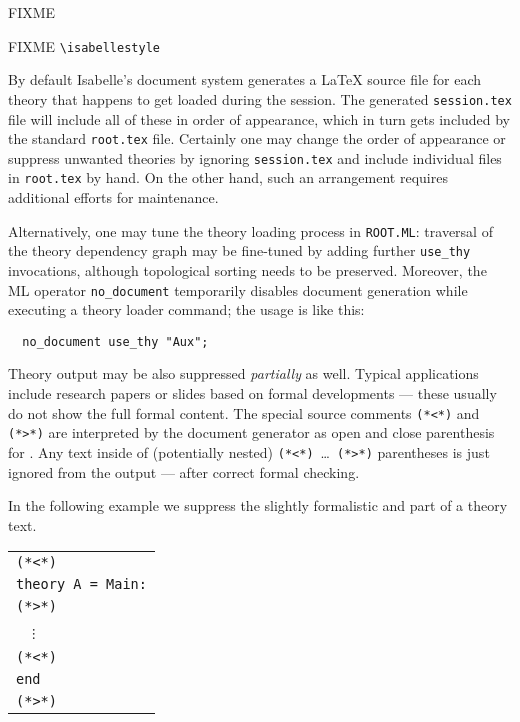 \begin{isabellebody}
\begin{isamarkuptext}
  FIXME%
\end{isamarkuptext}%
\isamarkuptrue%
%
\isamarkuptrue%
%
\begin{isamarkuptext}%
FIXME \verb,\isabellestyle,%
\end{isamarkuptext}%
\isamarkuptrue%
%
\isamarkuptrue%
%
\begin{isamarkuptext}%
By default Isabelle's document system generates a {\LaTeX} source
  file for each theory that happens to get loaded during the session.
  The generated \texttt{session.tex} file will include all of these in
  order of appearance, which in turn gets included by the standard
  \texttt{root.tex} file.  Certainly one may change the order of
  appearance or suppress unwanted theories by ignoring
  \texttt{session.tex} and include individual files in
  \texttt{root.tex} by hand.  On the other hand, such an arrangement
  requires additional efforts for maintenance.

  Alternatively, one may tune the theory loading process in
  \texttt{ROOT.ML}: traversal of the theory dependency graph may be
  fine-tuned by adding further \verb,use_thy, invocations, although
  topological sorting needs to be preserved.  Moreover, the ML
  operator \verb,no_document, temporarily disables document generation
  while executing a theory loader command; the usage is like this:

\begin{verbatim}
  no_document use_thy "Aux";
\end{verbatim}

  Theory output may be also suppressed \emph{partially} as well.
  Typical applications include research papers or slides based on
  formal developments --- these usually do not show the full formal
  content.  The special source comments
  \verb,(,\verb,*,\verb,<,\verb,*,\verb,), and
  \verb,(,\verb,*,\verb,>,\verb,*,\verb,), are interpreted by the
  document generator as open and close parenthesis for
  .  Any text inside of (potentially nested)
  \verb,(,\verb,*,\verb,<,\verb,*,\verb,),~\dots~\verb,(,\verb,*,\verb,>,\verb,*,\verb,),
  parentheses is just ignored from the output --- after correct formal
  checking.

  In the following example we suppress the slightly formalistic
   and  part of a theory text.

  \medskip

  \begin{tabular}{l}
  \verb,(,\verb,*,\verb,<,\verb,*,\verb,), \\
  \texttt{theory A = Main:} \\
  \verb,(,\verb,*,\verb,>,\verb,*,\verb,), \\
  ~~$\vdots$ \\
  \verb,(,\verb,*,\verb,<,\verb,*,\verb,), \\
  \texttt{end} \\
  \verb,(,\verb,*,\verb,>,\verb,*,\verb,), \\
  \end{tabular}


\end{isamarkuptext}
\end{isabellebody}
